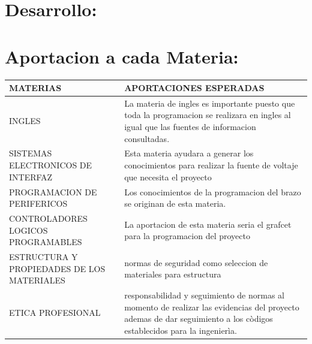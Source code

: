 \documentclass[14pt,a4paper]{article}
\begin{document}
\newpage

\section{Desarrollo:}

\section{Aportacion a cada Materia:}

\begin{tabular}{|p{70mm}|p{70mm}|} 

\hline
	MATERIAS & APORTACIONES ESPERADAS\\
\hline
	INGLES & La materia de ingles es importante puesto que toda la programacion se realizara en ingles al igual que las fuentes de informacion consultadas.\\
\hline
	SISTEMAS ELECTRONICOS DE INTERFAZ & Esta materia ayudara a generar los conocimientos para realizar la fuente de voltaje que necesita el proyecto\\
\hline
	PROGRAMACION DE PERIFERICOS & Los conocimientos de la programacion del brazo se originan de esta materia.\\
\hline
	CONTROLADORES LOGICOS PROGRAMABLES & La aportacion de esta materia seria el grafcet para la  programacion del proyecto\\
\hline
	ESTRUCTURA Y PROPIEDADES DE LOS MATERIALES & normas de seguridad como seleccion de materiales para estructura\\
\hline
	ETICA PROFESIONAL & responsabilidad y seguimiento de normas al momento de realizar las evidencias del proyecto ademas  de dar seguimiento a los còdigos establecidos para la ingenierìa.\\
\hline
\end{tabular}\\\\
\end{document}

